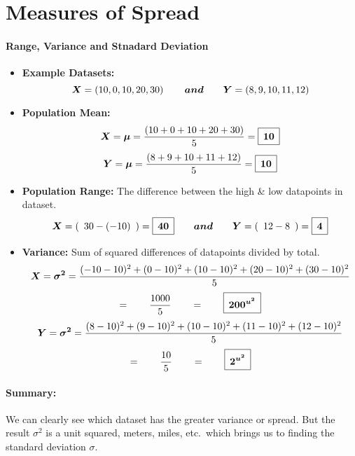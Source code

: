 \documentclass[12pt]{article}
\newcommand\padBox[1]{{\setlength\fboxsep{5pt}\boxed{#1}}}
\newcommand{\negBi}[3][2]{(#2- #3)^{#1}}
\newcommand*{\mB}[1]{\ifmmode\bm{#1}\else\textbf{#1}\fi}
\begin{document}
\section*{Measures of Spread}
\begingroup
	\paragraph{Range, Variance and Stnadard Deviation}%
	\dotfill
	\large
	\begin{itemize}
		\item\textbf{Example Datasets:}
			\[
				\mB{X}=
				\left(10, 0, 10, 20, 30\right)
				\qquad\mB{and}\qquad
				\mB{Y}=
				\left(8, 9, 10, 11, 12\right)
			\]
		\item\textbf{Population Mean:}
			\[
				\mB{X}=
				\mB{\mu}=\frac{\left(10 + 0 + 10 + 20 + 30\right)}{5}=
				\padBox{\mB{10}}
			\]
			\[
				\mB{Y}=
				\mB{\mu}=\frac{\left(8 + 9 + 10 + 11 + 12\right)}{5}=
				\padBox{\mB{10}}
			\]
		\item\textbf{Population Range: }
			The difference between the high \& low datapoints in dataset.
			\[
				\mB{X}=
				(\enspace30 - (-10)\enspace) = \padBox{\mB{40}}
				\qquad\mB{and}\qquad
				\mB{Y}=
				(\enspace12 - 8\enspace) = \padBox{\mB{4}}
			\]
		\item\textbf{Variance: }
		Sum of squared differences of datapoints divided by total.
			\[
				\mB{X}=
				\mB{\sigma^{2}} = \frac{
					\negBi{-10}{10} +
					\negBi{0}{10} +
					\negBi{10}{10} +
					\negBi{20}{10} +
					\negBi{30}{10}
				}
				{5}
			\]
			\[=\qquad\frac{1000}{5}\qquad=\qquad\padBox{\mB{200^{u^2}}}\]
			\[
				\mB{Y}=
				\mB{\sigma^{2}} = \frac{
					\negBi{8}{10} +
					\negBi{9}{10} +
					\negBi{10}{10} +
					\negBi{11}{10} +
					\negBi{12}{10}
				}
			{5}
			\]
			\[=\qquad\frac{10}{5}\qquad=\qquad\padBox{\mB{2^{u^2}}}\]
	\end{itemize}

\paragraph{Summary:}%

We can clearly see which dataset has the greater variance or spread.
But the result $\sigma^{2}$ is a unit squared, meters, miles, etc.\
which brings us to finding the standard deviation $\sigma$.
\end{document}
